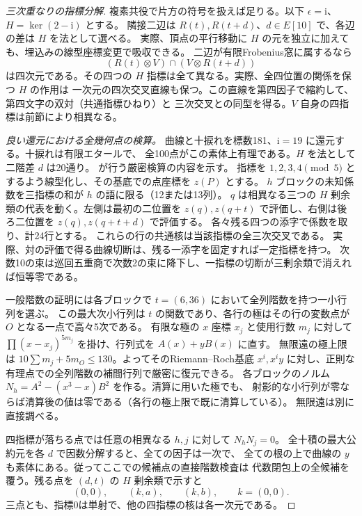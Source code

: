 \begin{proof}[三次重なりの指標分解]
複素共役で片方の符号を扱えば足りる。以下 $\epsilon=\mathrm i$、$H=\ker(2-\mathrm i)$ とする。
隣接二辺は $R(t),R(t+d)$、$d\in E[10]$ で、各辺の差は $H$ を法として選べる。
実際、頂点の平行移動に $H$ の元を独立に加えても、埋込みの線型座標変更で吸収できる。
二辺が有限Frobenius窓に属するなら
\[
 (R(t)\otimes V)\cap(V\otimes R(t+d))
\]
は四次元である。その四つの $H$ 指標は全て異なる。実際、全四位置の関係を保つ $H$ の作用は
一次元の四次交叉直線も保つ。この直線を第四因子で縮約して、第四文字の双対（共通指標ひねり）と
三次交叉との同型を得る。$V$ 自身の四指標は前節により相異なる。

\smallskip
\noindent\textit{良い還元における全幾何点の検算。}
曲線と十捩れを標数181、$\mathrm i=19$ に還元する。十捩れは有限エタールで、
全100点がこの素体上有理である。$H$ を法として二階差 $d$ は20通り。
が行う厳密検算の内容を示す。
指標を $1,2,3,4\pmod5$ とするよう線型化し、その基底での点座標を $z(P)$ とする。
$h$ ブロックの未知係数を三指標の和が $h$ の語に限る（12または13列）。
$q$ は相異なる三つの $H$ 剰余類の代表を動く。左側は最初の二位置を
$z(q),z(q+t)$ で評価し、右側は後ろ二位置を $z(q),z(q+t+d)$ で評価する。
各々残る四つの添字で係数を取り、計24行とする。
これらの行の共通核は当該指標の全三次交叉である。
実際、対の評価で得る曲線切断は、残る一添字を固定すれば一定指標を持つ。
次数10の束は巡回五重商で次数2の束に降下し、一指標の切断が三剰余類で消えれば恒等零である。

一般階数の証明には各ブロックで $t=(6,36)$ において全列階数を持つ一小行列を選ぶ。
この最大次小行列は $t$ の関数であり、各行の極はその行の変数点が $O$ となる一点で高々5次である。
有限な極の $x$ 座標 $x_j$ と使用行数 $m_j$ に対して
$\prod (x-x_j)^{5m_j}$ を掛け、行列式を $A(x)+y B(x)$ に直す。
無限遠の極上限は $10\sum m_j+5m_O\le130$。よってそのRiemann--Roch基底
$x^i,x^i y$ に対し、正則な有理点での全列階数の補間行列で厳密に復元できる。
各ブロックのノルム $N_h=A^2-(x^3-x)B^2$ を作る。清算に用いた極でも、
射影的な小行列が零ならば清算後の値は零である（各行の極上限で既に清算している）。
無限遠は別に直接調べる。

四指標が落ちる点では任意の相異なる $h,j$ に対して $N_hN_j=0$。
全十積の最大公約元を各 $d$ で因数分解すると、全ての因子は一次で、
全ての根の上で曲線の $y$ も素体にある。従ってここでの候補点の直接階数検査は
代数閉包上の全候補を覆う。残る点を $(d,t)$ の $H$ 剰余類で示すと
\[
 (0,0),\qquad (k,a),\qquad(k,b),\qquad k=(0,0).
\]
三点とも、指標0は単射で、他の四指標の核は各一次元である。


\end{proof}
